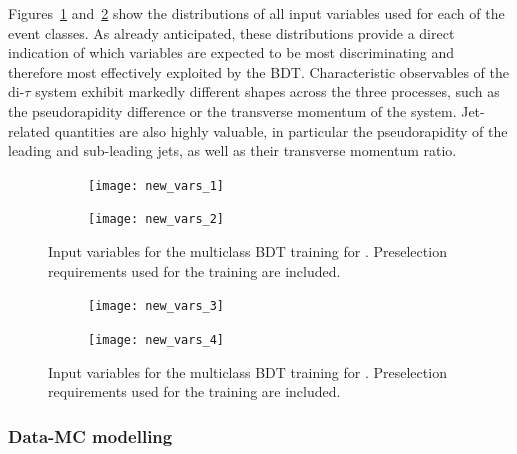 Figures~\ref{tth_vars_tmva_1} and~\ref{tth_vars_tmva_2} show the distributions of all input variables used for each of the event classes. As already anticipated, these distributions provide a direct indication of which variables are expected to be most discriminating and therefore most effectively exploited by the BDT. Characteristic observables of the di-$\tau$ system exhibit markedly different shapes across the three processes, such as the pseudorapidity difference or the transverse momentum of the system. Jet-related quantities are also highly valuable, in particular the pseudorapidity of the leading and sub-leading jets, as well as their transverse momentum ratio.

\begin{figure}[htbp]
    \centering
    \begin{subfigure}{0.95\linewidth}
      \centering
      \texttt{[image: new\_vars\_1]}
    \end{subfigure}
    \vspace{0.5cm} %
    \begin{subfigure}{0.95\linewidth}
      \centering
      \texttt{[image: new\_vars\_2]}
    \end{subfigure}
    \caption{Input variables for the multiclass BDT training for \ttHtt. Preselection requirements used for the training are included.}
    \label{tth_vars_tmva_1}
  \end{figure}

  \begin{figure}[htbp]
    \centering
    \begin{subfigure}{0.95\linewidth}
      \centering
      \texttt{[image: new\_vars\_3]}
    \end{subfigure}
    \vspace{0.5cm} %
    \begin{subfigure}{0.95\linewidth}
      \centering
      \texttt{[image: new\_vars\_4]}
    \end{subfigure}
    \caption{Input variables for the multiclass BDT training for \ttHtt. Preselection requirements used for the training are included.}
    \label{tth_vars_tmva_2}
  \end{figure}

\subsubsection*{Data-MC modelling}

